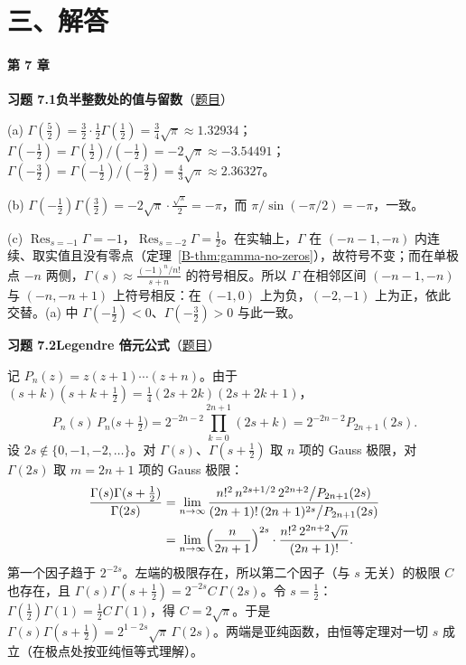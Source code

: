 \documentclass[11pt,a4paper]{article}
\DeclareMathOperator{\Res}{Res}
\newcommand{\bref}[1]{\ref*{B-#1}}
\newcommand{\Sol}[2]{%
  \par\addvspace{1.2em}\noindent
  \hypertarget{s:#1}{}\textbf{习题 #1\quad #2}\hfill{\small（\hyperlink{q:#1}{题目}）}\par
  \nopagebreak\smallskip}
\begin{document}
\newpage
\part*{三、解答}

\subsection*{第 7 章}

\Sol{7.1}{负半整数处的值与留数}
(a) $\Gamma(\tfrac52)=\tfrac32\cdot\tfrac12\Gamma(\tfrac12)=\tfrac34\sqrt\pi\approx1.32934$；
$\Gamma(-\tfrac12)=\Gamma(\tfrac12)/(-\tfrac12)=-2\sqrt\pi\approx-3.54491$；
$\Gamma(-\tfrac32)=\Gamma(-\tfrac12)/(-\tfrac32)=\tfrac43\sqrt\pi\approx2.36327$。

(b) $\Gamma(-\tfrac12)\Gamma(\tfrac32)=-2\sqrt\pi\cdot\tfrac{\sqrt\pi}2=-\pi$，而 $\pi/\sin(-\pi/2)=-\pi$，一致。

(c) $\Res_{s=-1}\Gamma=-1$，$\Res_{s=-2}\Gamma=\tfrac12$。在实轴上，$\Gamma$ 在 $(-n-1,-n)$ 内连续、取实值且没有零点（定理~\bref{thm:gamma-no-zeros}），故符号不变；而在单极点 $-n$ 两侧，$\Gamma(s)\approx\frac{(-1)^n/n!}{s+n}$ 的符号相反。所以 $\Gamma$ 在相邻区间 $(-n-1,-n)$ 与 $(-n,-n+1)$ 上符号相反：在 $(-1,0)$ 上为负，$(-2,-1)$ 上为正，依此交替。(a) 中 $\Gamma(-\tfrac12)<0$、$\Gamma(-\tfrac32)>0$ 与此一致。

\Sol{7.2}{Legendre 倍元公式}
记 $P_n(z)=z(z+1)\cdots(z+n)$。由于 $(s+k)(s+k+\tfrac12)=\tfrac14(2s+2k)(2s+2k+1)$，
\[
  P_n(s)\,P_n\bigl(s+\tfrac12\bigr)=2^{-2n-2}\prod_{k=0}^{2n+1}(2s+k)=2^{-2n-2}P_{2n+1}(2s).
\]
设 $2s\notin\{0,-1,-2,\dots\}$。对 $\Gamma(s)$、$\Gamma(s+\tfrac12)$ 取 $n$ 项的 Gauss 极限，对 $\Gamma(2s)$ 取 $m=2n+1$ 项的 Gauss 极限：
\[
\begin{aligned}
  \frac{\Gamma(s)\Gamma(s+\frac12)}{\Gamma(2s)}
  &=\lim_{n\to\infty}\frac{n!^2\,n^{2s+1/2}\,2^{2n+2}\big/P_{2n+1}(2s)}{(2n+1)!\,(2n+1)^{2s}\big/P_{2n+1}(2s)}\\
  &=\lim_{n\to\infty}\Bigl(\frac{n}{2n+1}\Bigr)^{2s}\cdot\frac{n!^2\,2^{2n+2}\sqrt n}{(2n+1)!}.
\end{aligned}
\]
第一个因子趋于 $2^{-2s}$。左端的极限存在，所以第二个因子（与 $s$ 无关）的极限 $C$ 也存在，且
$\Gamma(s)\Gamma(s+\tfrac12)=2^{-2s}C\,\Gamma(2s)$。令 $s=\tfrac12$：$\Gamma(\tfrac12)\Gamma(1)=\tfrac12C\,\Gamma(1)$，得 $C=2\sqrt\pi$。于是
$\Gamma(s)\Gamma(s+\tfrac12)=2^{1-2s}\sqrt\pi\,\Gamma(2s)$。两端是亚纯函数，由恒等定理对一切 $s$ 成立（在极点处按亚纯恒等式理解）。
\end{document}
